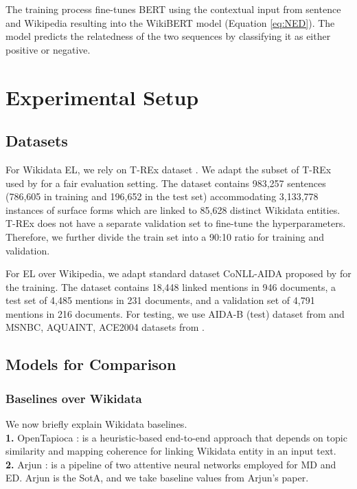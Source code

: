 \documentclass[11pt,a4paper]{article}
\begin{document}
The training process fine-tunes BERT using the contextual input from sentence and Wikipedia resulting into the WikiBERT model (Equation \eqref{eq:NED}). The model predicts the relatedness of the two sequences by classifying it as either positive or negative.



\section{Experimental Setup} \label{sec:experiment}
\subsection{Datasets}
For Wikidata EL, we rely on T-REx dataset \cite{DBLP:conf/lrec/ElSaharVRGHLS18}.
We adapt the subset of T-REx used by \citet{Mulang2019ContextawareEL} for a fair evaluation setting. The dataset contains 983,257 sentences (786,605 in training and 196,652 in the test set) accommodating 3,133,778 instances of surface forms which are linked to 85,628 distinct Wikidata entities. T-REx does not have a separate validation set to fine-tune the hyperparameters. Therefore, we further divide the train set into a 90:10 ratio for training and validation.

For EL over Wikipedia, we adapt standard dataset CoNLL-AIDA proposed by \cite{DBLP:conf/emnlp/HoffartYBFPSTTW11} for the training. The dataset contains 18,448 linked mentions in 946 documents, a test set of 4,485 mentions in 231 documents, and a validation set of 4,791 mentions in 216 documents. For testing, we use AIDA-B (test) dataset from \cite{DBLP:conf/emnlp/HoffartYBFPSTTW11} and  MSNBC, AQUAINT, ACE2004 datasets from \cite{guo2018robust}. 
\subsection{Models for Comparison} 
\subsubsection{Baselines over Wikidata}
We now briefly explain Wikidata baselines.\\
\textbf{1.} OpenTapioca \cite{delpeuch2019opentapioca}: is a heuristic-based end-to-end approach that depends on topic similarity and mapping coherence for linking Wikidata entity in an input text. \\
\textbf{2.} Arjun \cite{Mulang2019ContextawareEL}: is a pipeline of two attentive neural networks employed for MD and ED. Arjun is the SotA, and we take baseline values from Arjun's paper. 
\end{document}
